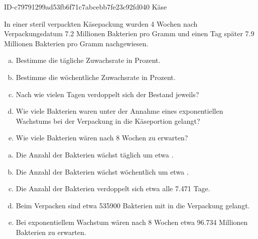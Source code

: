 \begin{exercise}
      {ID-c79791299ad53fb6f71c7abcebb7fe23c92fd040}
      {Käse}
  \ifproblem\problem\par
    In einer \glqq steril\grqq{} verpackten Käsepackung wurden
    4 Wochen nach Verpackungsdatum \num{7.2} Millionen
    Bakterien pro Gramm und einen Tag später \num{7.9} Millionen
    Bakterien pro Gramm nachgewiesen.
    \begin{enumerate}[a)]
      \item Bestimme die tägliche Zuwachsrate in Prozent.
      \item Bestimme die wöchentliche Zuwachsrate in Prozent.
      \item Nach wie vielen Tagen verdoppelt sich der Bestand jeweils?
      \item Wie viele Bakterien waren unter der Annahme eines
            exponentiellen Wachstums bei der Verpackung in die
            Käseportion gelangt?
      \item Wie viele Bakterien wären nach 8 Wochen zu erwarten?
    \end{enumerate}
  \fi
  \ifoutcome\outcome\par
    \begin{enumerate}[a)]
      \item Die Anzahl der Bakterien wächst täglich um etwa .
      \item Die Anzahl der Bakterien wächst wöchentlich um etwa .
      \item Die Anzahl der Bakterien verdoppelt sich etwa
            alle \num{7.471} Tage.
      \item Beim Verpacken sind etwa \num{535900} Bakterien mit
            in die Verpackung gelangt.
      \item Bei exponentiellem Wachstum wären nach 8
            Wochen etwa \num{96.734} Millionen Bakterien zu erwarten.
    \end{enumerate}
  \fi
\end{exercise}
